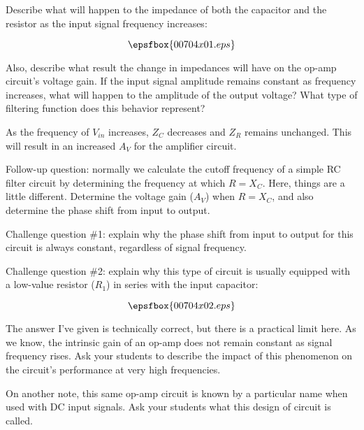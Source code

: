 

Describe what will happen to the impedance of both the capacitor and the resistor as the input signal frequency increases:

$$\epsfbox{00704x01.eps}$$

Also, describe what result the change in impedances will have on the op-amp circuit's voltage gain.  If the input signal amplitude remains constant as frequency increases, what will happen to the amplitude of the output voltage?  What type of filtering function does this behavior represent?







As the frequency of $V_{in}$ increases, $Z_C$ decreases and $Z_R$ remains unchanged.  This will result in an increased $A_V$ for the amplifier circuit.

\vskip 10pt

Follow-up question: normally we calculate the cutoff frequency of a simple RC filter circuit by determining the frequency at which $R = X_C$.  Here, things are a little different.  Determine the voltage gain ($A_V$) when $R = X_C$, and also determine the phase shift from input to output.

\vskip 10pt

Challenge question \#1: explain why the phase shift from input to output for this circuit is always constant, regardless of signal frequency.

\vskip 10pt

Challenge question \#2: explain why this type of circuit is usually equipped with a low-value resistor ($R_1$) in series with the input capacitor:

$$\epsfbox{00704x02.eps}$$







The answer I've given is technically correct, but there is a practical limit here.  As we know, the intrinsic gain of an op-amp does not remain constant as signal frequency rises.  Ask your students to describe the impact of this phenomenon on the circuit's performance at very high frequencies.

On another note, this same op-amp circuit is known by a particular name when used with DC input signals.  Ask your students what this design of circuit is called.





